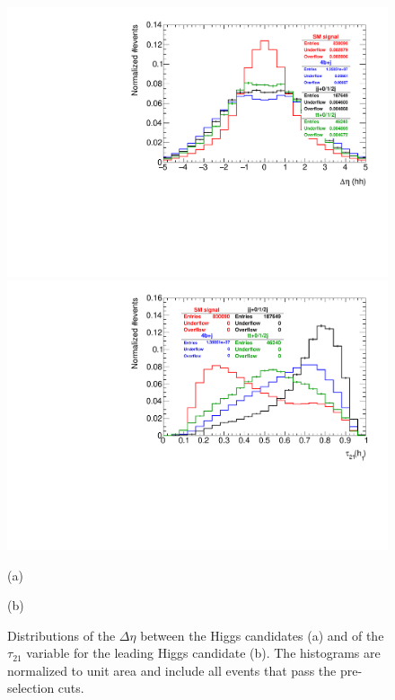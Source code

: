 \begin{figure}
	\centering
	\begin{minipage}{.5\textwidth}
		\centering
		\includegraphics[trim={.65cm 0 0 0},clip,width=\linewidth]{./Figures/hist_hh_deltaEta.pdf}
	\end{minipage}%
	\begin{minipage}{.5\textwidth}
		\centering
		\includegraphics[trim={0 0 .65cm 0},clip,width=\linewidth]{./Figures/hist_h1_tau21.pdf}
	\end{minipage}
	\begin{minipage}[t]{0.5\textwidth}
		\caption*{(a)}
	\end{minipage}%
	\hfill
	\begin{minipage}[t]{0.5\textwidth}
		\caption*{(b)}
	\end{minipage}
	\caption{Distributions of the $\Delta\eta$ between the Higgs candidates (a) and of the $\tau_{21}$ variable for the leading Higgs candidate (b).  The histograms are normalized to unit area and include all events that pass the pre-selection cuts.}
	\label{fig:hh_deltaEta_h1_tau21}
\end{figure}
	

